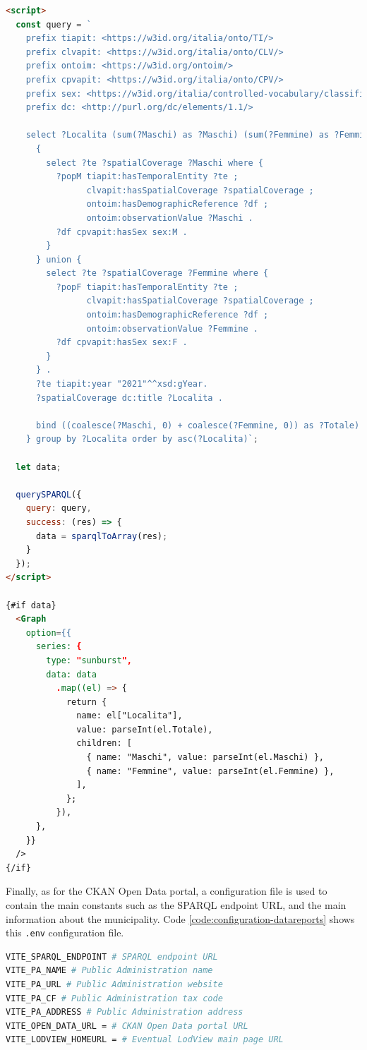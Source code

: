 \begin{lstlisting}[language=HTML,caption={The sunburst chart about the number of citizens by locality and gender.},label=code:demography-sunburst]
<script>
  const query = `
    prefix tiapit: <https://w3id.org/italia/onto/TI/>
    prefix clvapit: <https://w3id.org/italia/onto/CLV/>
    prefix ontoim: <https://w3id.org/ontoim/>
    prefix cpvapit: <https://w3id.org/italia/onto/CPV/>
    prefix sex: <https://w3id.org/italia/controlled-vocabulary/classifications-for-people/sex/>
    prefix dc: <http://purl.org/dc/elements/1.1/>

    select ?Localita (sum(?Maschi) as ?Maschi) (sum(?Femmine) as ?Femmine) (sum(?Totale) as ?Totale) where {
      {
        select ?te ?spatialCoverage ?Maschi where {
          ?popM tiapit:hasTemporalEntity ?te ;
                clvapit:hasSpatialCoverage ?spatialCoverage ;
                ontoim:hasDemographicReference ?df ;
                ontoim:observationValue ?Maschi .
          ?df cpvapit:hasSex sex:M .
        }
      } union {
        select ?te ?spatialCoverage ?Femmine where {
          ?popF tiapit:hasTemporalEntity ?te ;
                clvapit:hasSpatialCoverage ?spatialCoverage ;
                ontoim:hasDemographicReference ?df ;
                ontoim:observationValue ?Femmine .
          ?df cpvapit:hasSex sex:F .
        }
      } .
      ?te tiapit:year "2021"^^xsd:gYear.
      ?spatialCoverage dc:title ?Localita .
      
      bind ((coalesce(?Maschi, 0) + coalesce(?Femmine, 0)) as ?Totale)
    } group by ?Localita order by asc(?Localita)`;

  let data;

  querySPARQL({
    query: query,
    success: (res) => {
      data = sparqlToArray(res);
    }
  });
</script>

{#if data}
  <Graph
    option={{
      series: {
        type: "sunburst",
        data: data
          .map((el) => {
            return {
              name: el["Localita"],
              value: parseInt(el.Totale),
              children: [
                { name: "Maschi", value: parseInt(el.Maschi) },
                { name: "Femmine", value: parseInt(el.Femmine) },
              ],
            };
          }),
      },
    }}
  />
{/if}
\end{lstlisting}

Finally, as for the CKAN Open Data portal, a configuration file is used to contain the main constants such as the \ac{SPARQL} endpoint \ac{URL}, and the main information about the municipality. Code \ref{code:configuration-datareports} shows this \verb#.env# configuration file.

\begin{lstlisting}[language=bash,caption={The DataReports configuration file.},label=code:configuration-datareports]
VITE_SPARQL_ENDPOINT # SPARQL endpoint URL
VITE_PA_NAME # Public Administration name
VITE_PA_URL # Public Administration website
VITE_PA_CF # Public Administration tax code
VITE_PA_ADDRESS # Public Administration address
VITE_OPEN_DATA_URL = # CKAN Open Data portal URL
VITE_LODVIEW_HOMEURL = # Eventual LodView main page URL
\end{lstlisting}